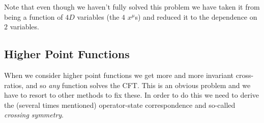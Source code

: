 \br 
    Note that even though we haven't fully solved this problem we have taken it from being a function of $4D$ variables (the $4$ $x^{\mu}$s) and reduced it to the dependence on $2$ variables. 
\er 

\subsection{Higher Point Functions}

When we consider higher point functions we get more and more invariant cross-ratios, and so \textit{any} function solves the CFT. This is an obvious problem and we have to resort to other methods to fix these. In order to do this we need to derive the (several times mentioned) operator-state correspondence and so-called \textit{crossing symmetry}. 